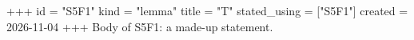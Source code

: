+++
id = "S5F1"
kind = "lemma"
title = "T"
stated_using = ["S5F1"]
created = 2026-11-04
+++
Body of S5F1: a made-up statement.
